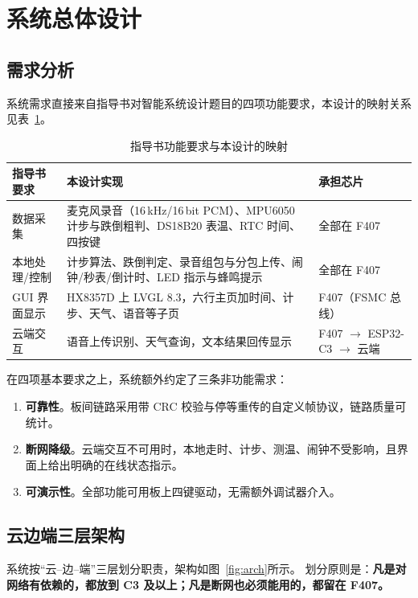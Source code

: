 \section{系统总体设计}

\subsection{需求分析}
系统需求直接来自指导书对智能系统设计题目的四项功能要求，本设计的映射关系见表~\ref{tab:req}。

\begin{table}[htbp]
\centering\small
\caption{指导书功能要求与本设计的映射}\label{tab:req}
\begin{tabular}{@{}p{4.2cm}p{5.4cm}p{4.6cm}@{}}
\toprule
指导书要求 & 本设计实现 & 承担芯片\\
\midrule
数据采集 & 麦克风录音（16\,kHz/16\,bit PCM）、MPU6050 计步与跌倒粗判、DS18B20 表温、RTC 时间、四按键 & 全部在 F407\\
本地处理/控制 & 计步算法、跌倒判定、录音组包与分包上传、闹钟/秒表/倒计时、LED 指示与蜂鸣提示 & 全部在 F407\\
GUI 界面显示 & HX8357D 上 LVGL 8.3，六行主页加时间、计步、天气、语音等子页 & F407（FSMC 总线）\\
云端交互 & 语音上传识别、天气查询，文本结果回传显示 & F407 $\to$ ESP32-C3 $\to$ 云端\\
\bottomrule
\end{tabular}
\end{table}

在四项基本要求之上，系统额外约定了三条非功能需求：
\begin{enumerate}[label=（\arabic*）]
\item \textbf{可靠性}。板间链路采用带 CRC 校验与停等重传的自定义帧协议，链路质量可统计。
\item \textbf{断网降级}。云端交互不可用时，本地走时、计步、测温、闹钟不受影响，且界面上给出明确的在线状态指示。
\item \textbf{可演示性}。全部功能可用板上四键驱动，无需额外调试器介入。
\end{enumerate}

\subsection{云边端三层架构}
系统按``云--边--端''三层划分职责，架构如图~\ref{fig:arch}所示。
划分原则是：\textbf{凡是对网络有依赖的，都放到 C3 及以上；凡是断网也必须能用的，都留在 F407。}

